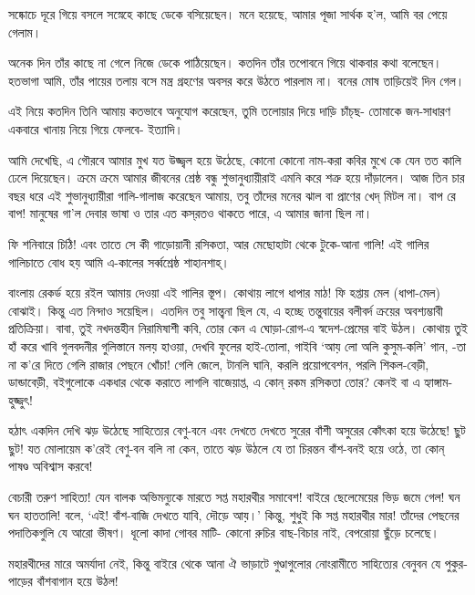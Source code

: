 \documentclass[a4paper,11pt]{article}
\begin{document}
\begin{multicols}{3}
{\begin{spacing}{1.15}
সষ্কোচে দূরে গিয়ে বসলে সস্নেহে কাছে ডেকে বসিয়েছেন। মনে হয়েছে, আমার পূজা সার্থক হ’ল, আমি বর পেয়ে গেলাম।

অনেক দিন তাঁর কাছে না গেলে নিজে ডেকে পাঠিয়েছেন। কতদিন তাঁর তপোবনে গিয়ে থাকবার কথা বলেছেন। হতভাগা আমি, তাঁর পায়ের তলায় বসে মন্ত্র গ্রহণের অবসর করে উঠতে পারলাম না। বনের মোষ তাড়িয়েই দিন গেল।

এই নিয়ে কতদিন তিনি আমায় কতভাবে অনুযোগ করেছেন, তুমি তলোয়ার দিয়ে দাড়ি চাঁচ্‌ছ- তোমাকে জন-সাধারণ একবারে খানায় নিয়ে গিয়ে ফেলবে- ইত্যাদি।

আমি দেখেছি, এ গৌরবে আমার মুখ যত উজ্জ্বল হয়ে উঠেছে, কোনো কোনো নাম-করা কবির মুখে কে যেন তত কালি ঢেলে দিয়েছেন। ক্রমে ক্রমে আমার জীবনের শ্রেষ্ঠ বন্ধু শুভানুধ্যায়ীরাই এমনি করে শত্রু হয়ে দাঁড়ালেন। আজ তিন চার বছর ধরে এই শুভানুধ্যায়ীরা গালি-গালাজ করেছেন আমায়, তবু তাঁদের মনের ঝাল বা প্রাণের খেদ্‌ মিটল না। বাপ রে বাপ! মানুষের গা’ল দেবার ভাষা ও তার এত কস্‌রতও থাকতে পারে, এ আমার জানা ছিল না।

ফি শনিবারে চিঠি! এবং তাতে সে কী গাড়োয়ানী রসিকতা, আর মেছোহাটা থেকে টুকে-আনা গালি! এই গালির গালিচাতে বোধ হয় আমি এ-কালের সর্ব্বশ্রেষ্ঠ শাহানশাহ্‌।

বাংলায় রেকর্ড হয়ে রইল আমায় দেওয়া এই গালির স্তূপ। কোথায় লাগে ধাপার মাঠ! ফি হপ্তায় মেল (ধাপা-মেল) বোঝাই। কিন্তু এত নিন্দাও সয়েছিল। এতদিন তবু সান্ত্বনা ছিল যে, এ হচ্ছে তন্তুবায়ের বলীবর্দ ক্রয়ের অবশ্যম্ভাবী প্রতিক্রিয়া। বাবা, তুই নখদন্তহীন নিরামিষাশী কবি, তোর কেন এ ঘোড়া-রোগ-এ স্বদেশ-প্রেমের বাই উঠল। কোথায় তুই হাঁ করে খাবি গুলবদনীর গুলিস্তানে মলয় হাওয়া, দেখবি ফুলের হাই-তোলা, গাইবি ‘আয় লো অলি কুসুম-কলি’ গান, -তা না ক’রে দিতে গেলি রাজার পেছনে খোঁচা! গেলি জেলে, টানলি ঘানি, করলি প্রয়োপবেশন, পরলি শিকল-বেড়ী, ডান্ডাবেড়ী, বইগুলোকে একধার থেকে করাতে লাগলি বাজেয়াপ্ত, এ কোন্‌ রকম রসিকতা তোর? কেনই বা এ হ্যাঙ্গাম-হুজ্জুৎ!
\begin{window}
হঠাৎ একদিন দেখি ঝড় উঠেছে সাহিত্যের বেণু-বনে এবং দেখতে দেখতে সুরের বাঁশী অসুরের কোঁৎকা হয়ে উঠেছে! ছুট ছুট! যত মোলায়েম ক’রেই বেণু-বন বলি না কেন, তাতে ঝড় উঠলে যে তা চিরন্তন বাঁশ-বনই হয়ে ওঠে, তা কোন্‌ পাষণ্ড অবিশ্বাস করবে!\end{window}

বেচারী তরুণ সাহিত্য! যেন বালক অভিমন্যুকে মারতে সপ্ত মহারথীর সমাবেশ! বাইরে ছেলেমেয়ের ভিড় জমে গেল! ঘন ঘন হাততালি! বলে, ‘এই! বাঁশ-বাজি দেখতে যাবি, দৌড়ে আয়।’ কিন্তু, শুধুই কি সপ্ত মহারথীর মার! তাঁদের পেছনের পদাতিকগুলি যে আরো ভীষণ। ধূলো কাদা গোবর মাটি- কোনো রুচির বাছ-বিচার নাই, বেপরোয়া ছুঁড়ে চলেছে।

মহারথীদের মারে অমর্যাদা নেই, কিন্তু বাইরে থেকে আনা ঐ ভাড়াটে গুণ্ডাগুলোর নোংরামীতে সাহিত্যের বেনুবন যে পুকুর-পাড়ের বাঁশবাগান হয়ে উঠল!


\end{spacing}}
\end{multicols}
\end{document}
